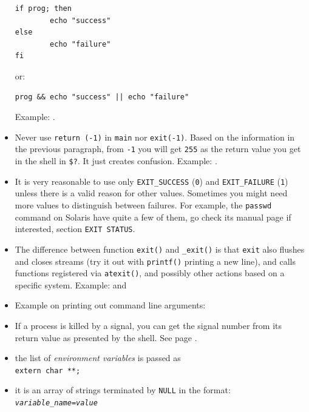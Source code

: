 \begin{itemize}
\begin{verbatim}
if prog; then
        echo "success"
else
        echo "failure"
fi
\end{verbatim}

or:

\begin{verbatim}
prog && echo "success" || echo "failure"
\end{verbatim}
Example: .
\item {} Never use \texttt{return (-1)} in \texttt{main} nor
\texttt{exit(-1)}.  Based on the information in the previous paragraph,
from \texttt{-1} you will get \texttt{255} as the return value you get in the
shell in \texttt{\$?}.  It just creates confusion.
Example: .
\item It is very reasonable to use only \texttt{EXIT\_SUCCESS} (\texttt{0}) and
\texttt{EXIT\_FAILURE} (\texttt{1}) unless there is a valid reason for other
values.  Sometimes you might need more values to distinguish between failures.
For example, the \texttt{passwd} command on Solaris have quite a few of them, go
check its manual page if interested, section \texttt{EXIT STATUS}.
\item The difference between function \texttt{exit()} and \verb#_exit()# is that
\texttt{exit} also flushes and closes streams (try it out with \texttt{printf()}
 printing a new line), and calls functions registered via
\texttt{atexit()}, and possibly other actions based on a specific system.
Example:  and 
\item {} Example on printing out command line arguments:
\item If a process is killed by a signal, you can get the signal number from its
return value as presented by the shell.  See page
\pageref{SHELLRETVALUEFORSIGNALS}.
\end{itemize}


\begin{slide}
\begin{itemize}
\item the list of \emph{environment
variables} is passed as\\ \texttt{extern char
**;}
\item it is an array of strings terminated by \texttt{NULL} in the
format: \texttt{\emph{variable\_name}=\emph{value}}
\end{itemize}
\begin{center}

\end{center}
\end{slide}

